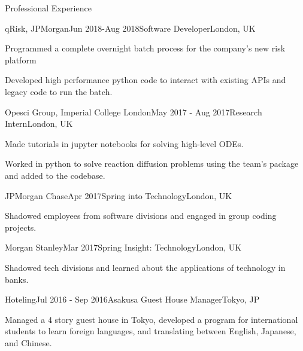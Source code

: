 \documentclass[10pt]{resume} %
\begin{document}
\begin{rSection}{Professional Experience}


\begin{rSubsection}{qRisk, JPMorgan}{Jun 2018-Aug 2018}{Software
Developer}{London, UK}
  \item Programmed a complete overnight batch process for the company's new
risk platform
  \item Developed high performance python code to interact with existing APIs
and legacy code to run the batch.
\end{rSubsection}


\begin{rSubsection}{Opesci Group, Imperial College London}{May 2017 - Aug 2017}{Research Intern}{London, UK}
    \item Made tutorials in jupyter notebooks for solving high-level ODEs.
    \item Worked in python to solve reaction diffusion problems using the team's package and added to the codebase.
\end{rSubsection}


\begin{rSubsection}{JPMorgan Chase}{Apr 2017}{Spring into Technology}{London, UK}
    \item Shadowed employees from software divisions and engaged in group coding projects.
\end{rSubsection}


\begin{rSubsection}{Morgan Stanley}{Mar 2017}{Spring Insight: Technology}{London, UK}
    \item Shadowed tech divisions and learned about the applications of technology in banks.
\end{rSubsection}


\begin{rSubsection}{Hoteling}{Jul 2016 - Sep 2016}{Asakusa Guest House Manager}{Tokyo, JP}
    \item Managed a 4 story guest house in Tokyo, developed a program for international students to learn foreign languages, and translating between English, Japanese, and Chinese.
\end{rSubsection}


\end{rSection}
\end{document}
